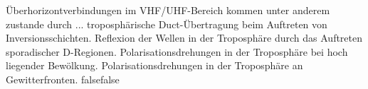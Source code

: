     {Überhorizontverbindungen im VHF/UHF-Bereich kommen unter anderem zustande durch ...}
    {troposphärische Duct-Übertragung beim Auftreten von Inversionsschichten.}
    {Reflexion der Wellen in der Troposphäre durch das Auftreten sporadischer D-Regionen.}
    {Polarisationsdrehungen in der Troposphäre bei hoch liegender Bewölkung.}
    {Polarisationsdrehungen in der Troposphäre an Gewitterfronten.}
    {false}{false}